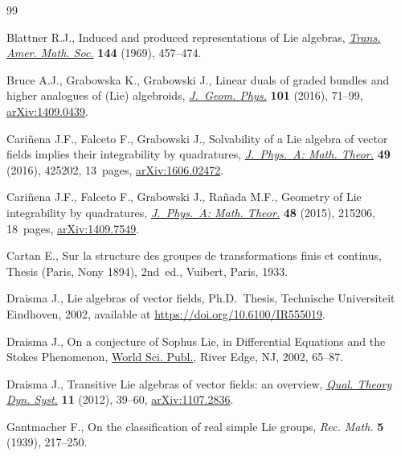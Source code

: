 \documentclass[pdftex]{sigma}
\numberwithin{equation}{section}
\begin{document}
\begin{thebibliography}{99}
\footnotesize\itemsep=0pt

Blattner R.J., Induced and produced representations of {L}ie algebras,
 \href{https://doi.org/10.2307/1995292}{\textit{Trans. Amer. Math. Soc.}} \textbf{144} (1969), 457--474.

Bruce A.J., Grabowska K., Grabowski J., Linear duals of graded bundles and
 higher analogues of ({L}ie) algebroids, \href{https://doi.org/10.1016/j.geomphys.2015.12.004}{\textit{J.~Geom. Phys.}} \textbf{101}
 (2016), 71--99, \href{https://arxiv.org/abs/1409.0439}{arXiv:1409.0439}.

Cari\~{n}ena J.F., Falceto F., Grabowski J., Solvability of a {L}ie algebra of
 vector fields implies their integrability by quadratures, \href{https://doi.org/10.1088/1751-8113/49/42/425202}{\textit{J.~Phys.~A:
 Math. Theor.}} \textbf{49} (2016), 425202, 13~pages, \href{https://arxiv.org/abs/1606.02472}{arXiv:1606.02472}.

Cari\~{n}ena J.F., Falceto F., Grabowski J., Ra\~{n}ada M.F., Geometry of {L}ie
 integrability by quadratures, \href{https://doi.org/10.1088/1751-8113/48/21/215206}{\textit{J.~Phys.~A: Math. Theor.}} \textbf{48}
 (2015), 215206, 18~pages, \href{https://arxiv.org/abs/1409.7549}{arXiv:1409.7549}.

Cartan E., Sur la structure des groupes de transformations finis et continus,
 {T}hesis (Paris, Nony 1894), 2nd~ed., Vuibert, Paris, 1933.

Draisma J., Lie algebras of vector fields, Ph.D.~Thesis, {T}echnische
 Universiteit Eindhoven, 2002, available at \url{https://doi.org/10.6100/IR555019}.

Draisma J., On a conjecture of {S}ophus {L}ie, in Differential Equations and
 the {S}tokes Phenomenon, \href{https://doi.org/10.1142/9789812776549_0005}{World Sci. Publ.}, River Edge, NJ, 2002, 65--87.

Draisma J., Transitive {L}ie algebras of vector fields: an overview,
 \href{https://doi.org/10.1007/s12346-011-0062-9}{\textit{Qual. Theory Dyn. Syst.}} \textbf{11} (2012), 39--60,
 \href{https://arxiv.org/abs/1107.2836}{arXiv:1107.2836}.

Gantmacher F., On the classification of real simple {L}ie groups, \textit{Rec.
 Math.} \textbf{5} (1939), 217--250.


\end{thebibliography}
\end{document}
